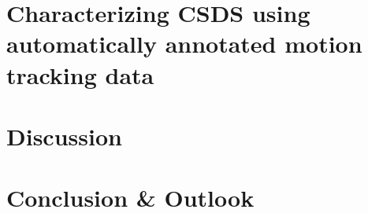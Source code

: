 \documentclass[%
]{tumDiss}
\begin{document}
\chapter{Characterizing CSDS using automatically annotated motion tracking data}
\label{chap:natcomm}


\chapter{Discussion}
\label{chap:discussion}


\chapter{Conclusion \& Outlook}
\label{chap:conclusions}





\end{document}
